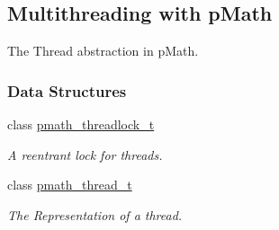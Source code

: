 \hypertarget{group__threads}{
\subsection{Multithreading with pMath}
\label{group__threads}
}
The Thread abstraction in pMath.  


\subsubsection*{Data Structures}
\begin{CompactItemize}
\item 
class \hyperlink{classpmath__threadlock__t}{pmath\_\-threadlock\_\-t}
\begin{CompactList}\small\item\em A reentrant lock for threads. \item\end{CompactList}\item 
class \hyperlink{classpmath__thread__t}{pmath\_\-thread\_\-t}
\begin{CompactList}\small\item\em The Representation of a thread. \item\end{CompactList}\end{CompactItemize}

